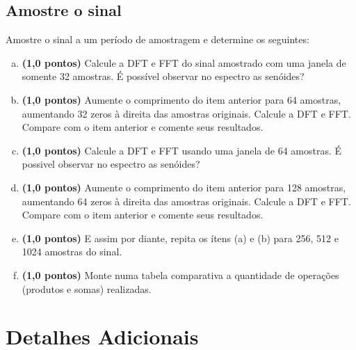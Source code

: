 \documentclass[conference]{IEEEtran}
\begin{document}
\subsection*{Amostre o sinal}
Amostre o sinal  a um período de amostragem e determine os seguintes:

\begin{enumerate}[(a)]
\item \textbf{(1,0 pontos)} Calcule a DFT e FFT do sinal amostrado com uma janela de somente 32 amostras. É possível observar no espectro as senóides?
\item \textbf{(1,0 pontos)} Aumente o comprimento do item anterior para 64 amostras, aumentando 32 zeros à direita das amostras originais. Calcule a DFT e FFT. Compare com o item anterior e comente
seus resultados.
\item \textbf{(1,0 pontos)} Calcule a DFT e FFT usando uma janela de 64 amostras. É possivel observar no espectro as senóides?
\item \textbf{(1,0 pontos)} Aumente o comprimento do item anterior para 128 amostras, aumentando 64 zeros à direita das amostras originais. Calcule a DFT e FFT. Compare com o item anterior e comente seus resultados.
\item \textbf{(1,0 pontos)} E assim por diante, repita os ítens (a) e (b) para 256, 512 e 1024 amostras do sinal.
\item \textbf{(1,0 pontos)} Monte numa tabela comparativa a quantidade de operações (produtos e somas) realizadas.
\end{enumerate}


\appendix
\section{Detalhes Adicionais}
\end{document}
